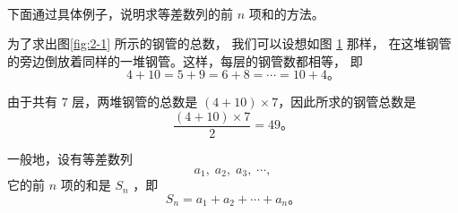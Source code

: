 \lianxi
\begin{xiaotis}

\xiaoti{}
\begin{xiaoxiaotis}

    \vspace{-1.6em} \begin{minipage}{0.9\textwidth}
    \end{minipage}




\end{xiaoxiaotis}

\begin{xiaoxiaotis}





\end{xiaoxiaotis}

\end{xiaotis}

\,

下面通过具体例子，说明求等差数列的前 $n$ 项和的方法。

为了求出图\ref{fig:2-1} 所示的钢管的总数， 我们可以设想如图 \ref{fig:2-4} 那样，
在这堆钢管的旁边倒放着同样的一堆钢管。这样，每层的钢管数都相等， 即
$$ 4 + 10 = 5 + 9 = 6 + 8 = \cdots = 10 + 4 \text{。}$$

\begin{figure}[htbp]
    \centering
    
    \caption{}\label{fig:2-4}
\end{figure}

由于共有 $7$ 层，两堆钢管的总数是 $(4 + 10) \times 7$，因此所求的钢管总数是
$$ \dfrac{(4 + 10) \times 7}{2} = 49 \text{。}$$

一般地，设有等差数列
$$ a_1,\; a_2,\; a_3,\; \cdots ,$$
它的前 $n$ 项的和是 $S_n$ ，即
$$ S_n = a_1 + a_2 + \cdots + a_n \text{。}$$

